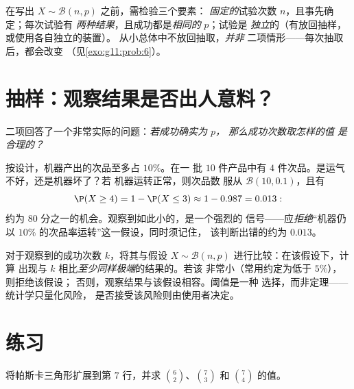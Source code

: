 \begin{method}[识别二项情形]\label{met:g11:binom:recognize}
在写出 $X \sim \mathcal B(n, p)$ 之前，需检验三个要素：
\emph{固定的}试验次数 $n$，且事先确定；每次试验有
\emph{两种结果}，且成功都是\emph{相同的} $p$；试验是
\emph{独立}的（有放回抽样，或使用各自独立的装置）。
从小总体中不放回抽取，\emph{并非}
二项情形——每次抽取后，都会改变
（见\cref{exo:g11:prob:6}）。
\end{method}

\section{抽样：观察结果是否出人意料？}

二项回答了一个非常实际的问题：\emph{若成功确实为 $p$，
那么成功次数取怎样的值
是合理的？}

\begin{example}\label{ex:g11:binom:decision}
按设计，机器产出的次品至多占 $10\%$。在一
批 $10$ 件产品中有 $4$ 件次品。是运气不好，还是机器坏了？若
机器运转正常，则次品数
服从 $\mathcal B(10, 0.1)$，且有
\[
\P(X \geq 4) = 1 - \P(X \leq 3) \approx 1 - 0.987 = 0.013 :
\]
约为 $80$ 分之一的机会。观察到如此小的，是一个强烈的
信号——应\emph{拒绝}“机器仍
以 $10\%$ 的次品率运转”这一假设，同时须记住，
该判断出错的约为 $0.013$。
\end{example}

\begin{method}[基于二项模型的判定准则]\label{met:g11:binom:decision}
对于观察到的成功次数 $k$，将其与假设
$X \sim \mathcal B(n, p)$ 进行比较：在该假设下，计算
出现与 $k$ 相比\emph{至少同样极端}的结果的。若该
非常小（常用约定为低于 $5\%$），则拒绝该假设；
否则，观察结果与该假设相容。阈值是一种
选择，而非定理——统计学只量化风险，
是否接受该风险则由使用者决定。
\end{method}

\section{练习}

\begin{exercise}[$\star$]\label{exo:g11:binom:1}
将帕斯卡三角形扩展到第 $7$ 行，并求
$\binom62$、$\binom{7}{3}$ 和 $\binom74$ 的值。
\end{exercise}

